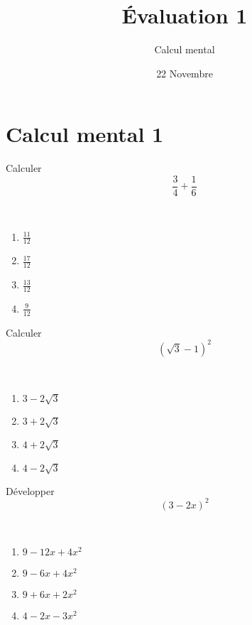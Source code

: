 \documentclass[17pt,xcolor=x11names]{beamer}
\begin{document}
\begin{frame}
  \title{Évaluation 1}
  \author{Calcul mental}
\date{22 Novembre}
\titlepage
\end{frame}

\section{Calcul mental 1}

\begin{frame}
  \begin{center}
    Calculer
    \[
      \frac{3}{4}+\frac{1}{6}
    \]
  \end{center}~\\
  \begin{multicols}{2}
    \begin{enumerate}[label=(\Alph*)]
      \item $\frac{11}{12}$
      \item $\frac{17}{12}$
      \item $\frac{13}{12}$
      \item $\frac{9}{12}$
    \end{enumerate}
  \end{multicols}
\end{frame}

\begin{frame}
  \begin{center}
    Calculer
    \[
      (\sqrt3-1)^2
    \]
  \end{center}~\\
  \begin{multicols}{2}
    \begin{enumerate}[label=(\Alph*)]
      \item $3-2\sqrt3$
      \item $3+2\sqrt3$
      \item $4+2\sqrt3$
      \item $4-2\sqrt3$
    \end{enumerate}
  \end{multicols}
\end{frame}

\begin{frame}
  \begin{center}
    Développer
    \[
      (3-2x)^2
    \]
  \end{center}~\\
  \begin{multicols}{2}
    \begin{enumerate}[label=(\Alph*)]
      \item $9-12x+4x^2$
      \item $9-6x+4x^2$
      \item $9+6x+2x^2$
      \item $4-2x-3x^2$
    \end{enumerate}
  \end{multicols}
\end{frame}
\end{document}
